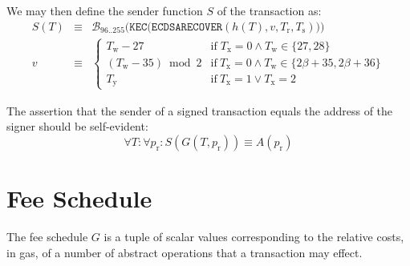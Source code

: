 \documentclass[9pt,oneside]{amsart}
\begin{document}
We may then define the sender function $S$ of the transaction as:
\begin{eqnarray}
S(T) &\equiv& \mathcal{B}_{96..255}\big(\mathtt{KEC}\big( \mathtt{ECDSARECOVER}(h(T), v, T_{\mathrm{r}}, T_{\mathrm{s}}) \big) \big) \\
v &\equiv& \begin{cases}
T_{\mathrm{w}} - 27 & \text{if} \; T_{\mathrm{x}} = 0 \land T_{\mathrm{w}} \in \{27, 28\} \\
(T_{\mathrm{w}}-35) \bmod 2 & \text{if} \ T_{\mathrm{x}} = 0 \land T_{\mathrm{w}} \in \{2\beta + 35, 2\beta + 36\} \\
T_{\mathrm{y}} & \text{if} \ T_{\mathrm{x}} = 1 \lor T_{\mathrm{x}} = 2
\end{cases}
\end{eqnarray}

The assertion that the sender of a signed transaction equals the address of the signer should be self-evident:
\begin{equation}
\forall T: \forall p_{\mathrm{r}}: S(G(T, p_{\mathrm{r}})) \equiv A(p_{\mathrm{r}})
\end{equation}

\section{Fee Schedule}\label{app:fees}

\nopagebreak
The fee schedule $G$ is a tuple of scalar values corresponding to the relative costs, in gas, of a number of abstract operations that a transaction may effect.
\end{document}
